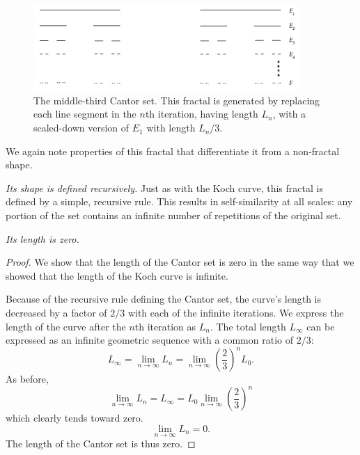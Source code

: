 \begin{figure}[h]
\centering
\includegraphics[width=0.9\textwidth]{Chapters/Figures/cantorset.png} 
\caption[Middle-third Cantor set]{The middle-third Cantor set. This fractal is generated by replacing each line segment in the $n$th iteration, having length $L_n$, with a scaled-down version of $E_1$ with length $L_n/3$.}\label{fig:cantorset}
\end{figure}

We again note properties of this fractal that differentiate it from a non-fractal shape.

\begin{myobs}\textit{Its shape is defined recursively.} Just as with the Koch curve, this fractal is defined by a simple, recursive rule. This results in self-similarity at all scales: any portion of the set contains an infinite number of repetitions of the original set.\end{myobs}

\begin{myobs}\textit{Its length is zero.}\end{myobs}
\begin{proof}
We show that the length of the Cantor set is zero in the same way that we showed that the length of the Koch curve is infinite. 

Because of the recursive rule defining the Cantor set, the curve's length is decreased by a factor of $ 2/3 $ with each of the infinite iterations. We express the length of the curve after the $n$th iteration as $L_n$. The total length $L_\infty$ can be expressed as an infinite geometric sequence with a common ratio of $ 2/3 $:
\begin{equation}
	L_\infty = \lim_{n \to \infty}L_n = \lim_{n \to \infty}\left(\frac{2}{3}\right)^n L_0.
\end{equation}
As before,
\begin{equation}
	\lim_{n \to \infty}L_n = L_\infty = L_0 \lim_{n \to \infty} \left(\frac{2}{3}\right)^n
\end{equation}
which clearly tends toward zero.
\begin{equation}
	\lim_{n \to \infty}L_n = 0. 
\end{equation}
The length of the Cantor set is thus zero.
\end{proof}

